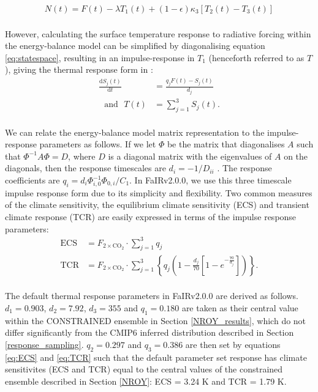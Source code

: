 \documentclass[gmd, manuscript]{copernicus}
\begin{document}
\begin{align}
    N(t) = F(t) - \lambda T_1(t) + (1-\epsilon)\kappa_3 [T_2(t) - T_3(t)] \label{eq:TOA_flux}
\end{align}\\
However, calculating the surface temperature response to radiative forcing within the energy-balance model can be simplified by diagonalising equation \ref{eq:statespace}, resulting in an impulse-response in $T_1$ (henceforth referred to as $T$), giving the thermal response form in \cite{Millar2016} \citep{Tsutsui2017}:\\
\begin{align}
    \frac{\text{d}S_j(t)}{\text{d}t} &= \frac{q_jF(t) - S_j(t)}{d_j} \label{eq:response_comp}\\
    \text{~~and~~}T(t) &= \sum_{j=1}^{3}S_j(t). \label{eq:response_sum}
\end{align}\\
We can relate the energy-balance model matrix representation to the impulse-response parameters as follows. If we let $\Phi$ be the matrix that diagonalises $A$ such that $\Phi^{-1}A\Phi=D$, where $D$ is a diagonal matrix with the eigenvalues of $A$ on the diagonals, then the response timescales are $d_i=-1/D_{ii}$ \citep{Geoffroy2013}. The response coefficients are $q_i=d_i \Phi^{-1}_{i,0} \Phi_{0,i} / C_1$. In FaIRv2.0.0, we use this three timescale impulse response form due to its simplicity and flexibility. Two common measures of the climate sensitivity, the equilibrium climate sensitivity (ECS) and transient climate response (TCR) \citep{Collins2013} are easily expressed in terms of the impulse response parameters:\\
\begin{align}
    \text{ECS}&=F_{2\times \text{CO}_2} \cdot \sum_{j=1}^3 q_j \label{eq:ECS}\\
    \text{TCR}&=F_{2\times \text{CO}_2} \cdot \sum_{j=1}^3 \left\{q_j\left(1-\frac{d_j}{70}\left[1-e^{-\frac{70}{d_j}}\right]\right)\right\}. \label{eq:TCR}
\end{align}\\
The default thermal response parameters in FaIRv2.0.0 are derived as follows. $d_1=0.903$, $d_2=7.92$, $d_3=355$ and $q_1=0.180$ are taken as their central value within the CONSTRAINED ensemble in Section \ref{NROY_results}, which do not differ significantly from the CMIP6 inferred distribution described in Section \ref{response_sampling}. $q_2=0.297$ and $q_3=0.386$ are then set by equations \ref{eq:ECS} and \ref{eq:TCR} such that the default parameter set response has climate sensitivites (ECS and TCR) equal to the central values of the constrained ensemble described in Section \ref{NROY}: ECS = 3.24 K and TCR = 1.79 K.
\end{document}
